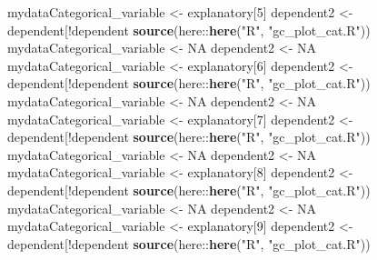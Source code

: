 \documentclass[
]{article}
\newenvironment{Shaded}{\begin{snugshade}}{\end{snugshade}}
\newcommand{\DecValTok}[1]{\textcolor[rgb]{0.69,0.50,0.00}{#1}}
\newcommand{\KeywordTok}[1]{\textcolor[rgb]{0.12,0.11,0.11}{\textbf{#1}}}
\newcommand{\NormalTok}[1]{\textcolor[rgb]{0.12,0.11,0.11}{#1}}
\newcommand{\OperatorTok}[1]{\textcolor[rgb]{0.12,0.11,0.11}{#1}}
\newcommand{\OtherTok}[1]{\textcolor[rgb]{0.00,0.43,0.16}{#1}}
\newcommand{\StringTok}[1]{\textcolor[rgb]{0.75,0.01,0.01}{#1}}
\begin{document}
\begin{Shaded}
\begin{Highlighting}[]
{{{{{{{{{{{{{{{{{{{{{{{{{{{{{{{{{{{{{{{{{{{{{{{{{{{{{{{{{{{{{{{{{{{{{{{{{{{{{{{{{{{{{{{{{{{{{{{{{{{{{{{{{{{{{{{{{{{{{{{{{{{{{{{{{{{{{{{{{{{{{{{{{{{{{{{{{{{{{{{{{{{{{{{{{{{{{{{{{{{{{{{{{{{{{{{{{{{{{{{{{{{{{{{{{{{{{{{{{{{{{{{{{{{{{{{\NormalTok{mydataCategorical_variable <-}\StringTok{ }\NormalTok{explanatory[}\DecValTok{5}\NormalTok{]}
\NormalTok{dependent2 <-}\StringTok{ }\NormalTok{dependent[}\OperatorTok{!}\NormalTok{dependent }\OperatorTok{%in%}\StringTok{ }\NormalTok{mydataCategorical_variable]}
\KeywordTok{source}\NormalTok{(here}\OperatorTok{::}\KeywordTok{here}\NormalTok{(}\StringTok{"R"}\NormalTok{, }\StringTok{"gc_plot_cat.R"}\NormalTok{))}
\NormalTok{mydataCategorical_variable <-}\StringTok{ }\OtherTok{NA}
\NormalTok{dependent2 <-}\StringTok{ }\OtherTok{NA}
\NormalTok{mydataCategorical_variable <-}\StringTok{ }\NormalTok{explanatory[}\DecValTok{6}\NormalTok{]}
\NormalTok{dependent2 <-}\StringTok{ }\NormalTok{dependent[}\OperatorTok{!}\NormalTok{dependent }\OperatorTok{%in%}\StringTok{ }\NormalTok{mydataCategorical_variable]}
\KeywordTok{source}\NormalTok{(here}\OperatorTok{::}\KeywordTok{here}\NormalTok{(}\StringTok{"R"}\NormalTok{, }\StringTok{"gc_plot_cat.R"}\NormalTok{))}
\NormalTok{mydataCategorical_variable <-}\StringTok{ }\OtherTok{NA}
\NormalTok{dependent2 <-}\StringTok{ }\OtherTok{NA}
\NormalTok{mydataCategorical_variable <-}\StringTok{ }\NormalTok{explanatory[}\DecValTok{7}\NormalTok{]}
\NormalTok{dependent2 <-}\StringTok{ }\NormalTok{dependent[}\OperatorTok{!}\NormalTok{dependent }\OperatorTok{%in%}\StringTok{ }\NormalTok{mydataCategorical_variable]}
\KeywordTok{source}\NormalTok{(here}\OperatorTok{::}\KeywordTok{here}\NormalTok{(}\StringTok{"R"}\NormalTok{, }\StringTok{"gc_plot_cat.R"}\NormalTok{))}
\NormalTok{mydataCategorical_variable <-}\StringTok{ }\OtherTok{NA}
\NormalTok{dependent2 <-}\StringTok{ }\OtherTok{NA}
\NormalTok{mydataCategorical_variable <-}\StringTok{ }\NormalTok{explanatory[}\DecValTok{8}\NormalTok{]}
\NormalTok{dependent2 <-}\StringTok{ }\NormalTok{dependent[}\OperatorTok{!}\NormalTok{dependent }\OperatorTok{%in%}\StringTok{ }\NormalTok{mydataCategorical_variable]}
\KeywordTok{source}\NormalTok{(here}\OperatorTok{::}\KeywordTok{here}\NormalTok{(}\StringTok{"R"}\NormalTok{, }\StringTok{"gc_plot_cat.R"}\NormalTok{))}
\NormalTok{mydataCategorical_variable <-}\StringTok{ }\OtherTok{NA}
\NormalTok{dependent2 <-}\StringTok{ }\OtherTok{NA}
\NormalTok{mydataCategorical_variable <-}\StringTok{ }\NormalTok{explanatory[}\DecValTok{9}\NormalTok{]}
\NormalTok{dependent2 <-}\StringTok{ }\NormalTok{dependent[}\OperatorTok{!}\NormalTok{dependent }\OperatorTok{%in%}\StringTok{ }\NormalTok{mydataCategorical_variable]}
\KeywordTok{source}\NormalTok{(here}\OperatorTok{::}\KeywordTok{here}\NormalTok{(}\StringTok{"R"}\NormalTok{, }\StringTok{"gc_plot_cat.R"}\NormalTok{))}
}}}}}}}}}}}}}}}}}}}}}}}}}}}}}}}}}}}}}}}}}}}}}}}}}}}}}}}}}}}}}}}}}}}}}}}}}}}}}}}}}}}}}}}}}}}}}}}}}}}}}}}}}}}}}}}}}}}}}}}}}}}}}}}}}}}}}}}}}}}}}}}}}}}}}}}}}}}}}}}}}}}}}}}}}}}}}}}}}}}}}}}}}}}}}}}}}}}}}}}}}}}}}}}}}}}}}}}}}}}}}}}}}}}}}}}}}}}}
\end{Highlighting}
\end{Shaded}
\end{document}
